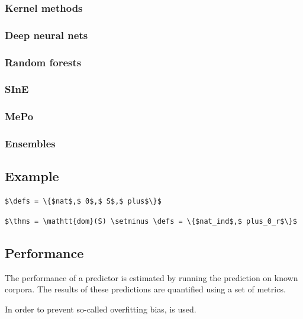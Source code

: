 \subsubsection{Kernel methods}
\subsubsection{Deep neural nets}
\subsubsection{Random forests}
\subsubsection{SInE}
\subsubsection{MePo}
\subsubsection{Ensembles}

\subsection{Example}

\begin{lstlisting}[language=Coq, mathescape, frame=none]
$\defs = \{$nat$,$ 0$,$ S$,$ plus$\}$
\end{lstlisting}

\begin{lstlisting}[language=Coq, mathescape, frame=none]
$\thms = \mathtt{dom}(S) \setminus \defs = \{$nat_ind$,$ plus_0_r$\}$
\end{lstlisting}

\subsection{Performance}
The performance of a predictor is estimated by running the prediction on known corpora.
The results of these predictions are quantified using a set of metrics.

In order to prevent so-called overfitting bias, \crossvalidation is used.



